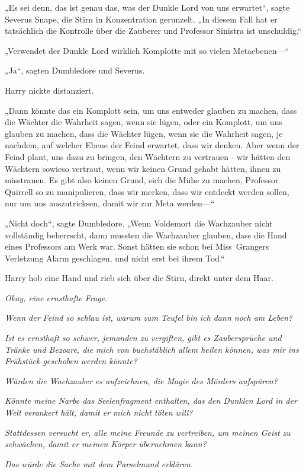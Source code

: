 {„Es sei denn, das ist genau das, was der Dunkle Lord von uns erwartet“, sagte Severus Snape, die Stirn in Konzentration gerunzelt. „In diesem Fall hat er tatsächlich die Kontrolle über die Zauberer und Professor Sinistra ist unschuldig.“

„Verwendet der Dunkle Lord wirklich Komplotte mit so vielen Metaebenen—“

„Ja“, sagten Dumbledore und Severus.

Harry nickte distanziert.

„Dann könnte das ein Komplott sein, um uns entweder glauben zu machen, dass die Wächter die Wahrheit sagen, wenn sie lügen, oder ein Komplott, um uns glauben zu machen, dass die Wächter lügen, wenn sie die Wahrheit sagen, je nachdem, auf welcher Ebene der Feind erwartet, dass wir denken. Aber wenn der Feind plant, uns dazu zu bringen, den Wächtern zu vertrauen - wir hätten den Wächtern sowieso vertraut, wenn wir keinen Grund gehabt hätten, ihnen zu misstrauen. Es gibt also keinen Grund, sich die Mühe zu machen, Professor Quirrell so zu manipulieren, dass wir merken, dass wir entdeckt werden sollen, nur um uns auszutricksen, damit wir zur Meta werden—“

„Nicht doch“, sagte Dumbledore. „Wenn Voldemort die Wachzauber nicht vollständig beherrscht, dann mussten die Wachzauber glauben, dass die Hand eines Professors am Werk war. Sonst hätten sie schon bei Miss~Grangers Verletzung Alarm geschlagen, und nicht erst bei ihrem Tod.“

Harry hob eine Hand und rieb sich über die Stirn, direkt unter dem Haar.

\emph{Okay, eine ernsthafte Frage.}

\emph{Wenn der Feind so schlau ist, warum zum Teufel bin ich dann noch am Leben?}

\emph{Ist es ernsthaft so schwer, jemanden zu vergiften, gibt es Zaubersprüche und Tränke und Bezoare, die mich von buchstäblich allem heilen können, was mir ins Frühstück geschoben werden könnte?}

\emph{Würden die Wachzauber es aufzeichnen, die Magie des Mörders aufspüren?}

\emph{Könnte meine Narbe das Seelenfragment enthalten, das den Dunklen Lord in der Welt verankert hält, damit er mich nicht töten will?}

\emph{Stattdessen versucht er, alle meine Freunde zu vertreiben, um meinen Geist zu schwächen, damit er meinen Körper übernehmen kann?}

\emph{Das würde die Sache mit dem Parselmund erklären.}

}
